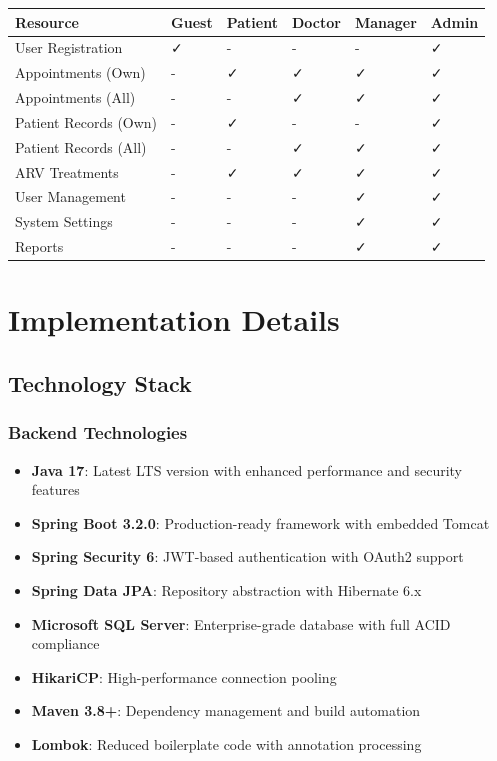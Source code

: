 \documentclass[12pt,a4paper]{article}
\begin{document}
\begin{longtable}{|p{2.5cm}|p{1.8cm}|p{1.8cm}|p{1.8cm}|p{1.8cm}|p{1.8cm}|}
\hline
\textbf{Resource} & \textbf{Guest} & \textbf{Patient} & \textbf{Doctor} & \textbf{Manager} & \textbf{Admin} \\
\hline
User Registration & ✓ & - & - & - & ✓ \\
\hline
Appointments (Own) & - & ✓ & ✓ & ✓ & ✓ \\
\hline
Appointments (All) & - & - & ✓ & ✓ & ✓ \\
\hline
Patient Records (Own) & - & ✓ & - & - & ✓ \\
\hline
Patient Records (All) & - & - & ✓ & ✓ & ✓ \\
\hline
ARV Treatments & - & ✓ & ✓ & ✓ & ✓ \\
\hline
User Management & - & - & - & ✓ & ✓ \\
\hline
System Settings & - & - & - & ✓ & ✓ \\
\hline
Reports & - & - & - & ✓ & ✓ \\
\hline
\end{longtable}

\section{Implementation Details}

\subsection{Technology Stack}

\subsubsection{Backend Technologies}
\begin{itemize}
    \item \textbf{Java 17}: Latest LTS version with enhanced performance and security features
    \item \textbf{Spring Boot 3.2.0}: Production-ready framework with embedded Tomcat
    \item \textbf{Spring Security 6}: JWT-based authentication with OAuth2 support
    \item \textbf{Spring Data JPA}: Repository abstraction with Hibernate 6.x
    \item \textbf{Microsoft SQL Server}: Enterprise-grade database with full ACID compliance
    \item \textbf{HikariCP}: High-performance connection pooling
    \item \textbf{Maven 3.8+}: Dependency management and build automation
    \item \textbf{Lombok}: Reduced boilerplate code with annotation processing
\end{itemize}
\end{document}
